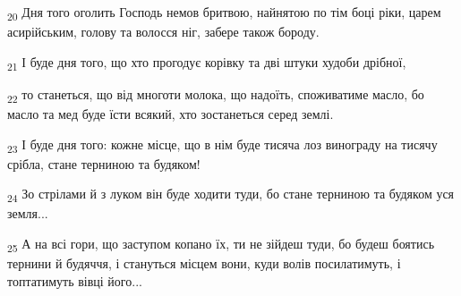 \begin{tcolorbox}
\textsubscript{20} Дня того оголить Господь немов бритвою, найнятою по тім боці ріки, царем асирійським, голову та волосся ніг, забере також бороду.
\end{tcolorbox}
\begin{tcolorbox}
\textsubscript{21} І буде дня того, що хто прогодує корівку та дві штуки худоби дрібної,
\end{tcolorbox}
\begin{tcolorbox}
\textsubscript{22} то станеться, що від многоти молока, що надоїть, споживатиме масло, бо масло та мед буде їсти всякий, хто зостанеться серед землі.
\end{tcolorbox}
\begin{tcolorbox}
\textsubscript{23} І буде дня того: кожне місце, що в нім буде тисяча лоз винограду на тисячу срібла, стане терниною та будяком!
\end{tcolorbox}
\begin{tcolorbox}
\textsubscript{24} Зо стрілами й з луком він буде ходити туди, бо стане терниною та будяком уся земля...
\end{tcolorbox}
\begin{tcolorbox}
\textsubscript{25} А на всі гори, що заступом копано їх, ти не зійдеш туди, бо будеш боятись тернини й будяччя, і стануться місцем вони, куди волів посилатимуть, і топтатимуть вівці його...
\end{tcolorbox}

